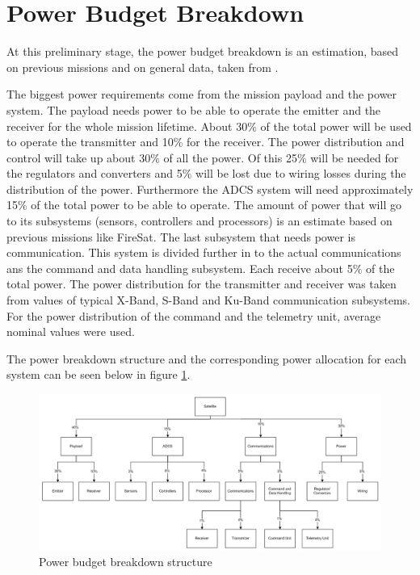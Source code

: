 \section{Power Budget Breakdown}
\label{blBudgetPower}

At this preliminary stage, the power budget breakdown is an estimation, based on previous missions and on general data, taken from \cite{larson}.

The biggest power requirements come from the mission payload and the power system. The payload needs power to be able to operate the emitter
and the receiver for the whole mission lifetime. About 30$\%$ of the total power will be used to operate the transmitter and 10$\%$ for the receiver. The power distribution and control will take up about 30$\%$ of all the power. Of this 25$\%$ will be needed for the regulators and converters and 5$\%$ will be lost due to wiring losses during the distribution of the power.
Furthermore the ADCS system will need approximately 15$\%$ of the total power to be able to operate. The amount of power that will go to its subsystems (sensors, controllers and processors) is an estimate based on previous missions like FireSat\cite{larson}.
The last subsystem that needs power is communication. This system is divided further in to the actual communications ans the command and data handling subsystem. Each receive about 5$\%$ of the total power.
The power distribution for the transmitter and receiver was taken from values of typical X-Band, S-Band and Ku-Band communication subsystems.
For the power distribution of the command and the telemetry unit, average nominal values were used\cite{larson}.

The power breakdown structure and the corresponding power allocation for each system can be seen below in figure \ref{fig:powerbudget}.

\begin{figure}
\centering
\includegraphics[width=1.0\textwidth, angle=90]{chapters/img/Power budget breakdown.jpg}
\caption{Power budget breakdown structure}
\label{fig:powerbudget}
\end{figure}